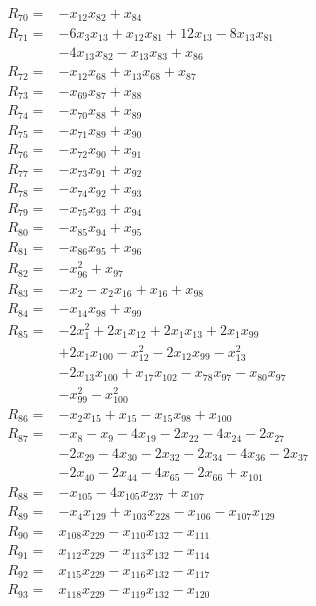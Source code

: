 \begin{align*}
R_{70}={}&-x_{12}x_{82} +x_{84}\\[3pt]
R_{71}={}&-6x_{3}x_{13} +x_{12}x_{81} +12x_{13} -8x_{13}x_{81}\\
&-4x_{13}x_{82} -x_{13}x_{83} +x_{86}\\[3pt]
R_{72}={}&-x_{12}x_{68} +x_{13}x_{68} +x_{87}\\[3pt]
R_{73}={}&-x_{69}x_{87} +x_{88}\\[3pt]
R_{74}={}&-x_{70}x_{88} +x_{89}\\[3pt]
R_{75}={}&-x_{71}x_{89} +x_{90}\\[3pt]
R_{76}={}&-x_{72}x_{90} +x_{91}\\[3pt]
R_{77}={}&-x_{73}x_{91} +x_{92}\\[3pt]
R_{78}={}&-x_{74}x_{92} +x_{93}\\[3pt]
R_{79}={}&-x_{75}x_{93} +x_{94}\\[3pt]
R_{80}={}&-x_{85}x_{94} +x_{95}\\[3pt]
R_{81}={}&-x_{86}x_{95} +x_{96}\\[3pt]
R_{82}={}&-x_{96}^{2} +x_{97}\\[3pt]
R_{83}={}&-x_{2} -x_{2}x_{16} +x_{16} +x_{98}\\[3pt]
R_{84}={}&-x_{14}x_{98} +x_{99}\\[3pt]
R_{85}={}&-2x_{1}^{2} +2x_{1}x_{12} +2x_{1}x_{13} +2x_{1}x_{99}\\
&+2x_{1}x_{100} -x_{12}^{2} -2x_{12}x_{99} -x_{13}^{2}\\
&-2x_{13}x_{100} +x_{17}x_{102} -x_{78}x_{97} -x_{80}x_{97}\\
&-x_{99}^{2} -x_{100}^{2}\\[3pt]
R_{86}={}&-x_{2}x_{15} +x_{15} -x_{15}x_{98} +x_{100}\\[3pt]
R_{87}={}&-x_{8} -x_{9} -4x_{19} -2x_{22} -4x_{24} -2x_{27}\\
&-2x_{29} -4x_{30} -2x_{32} -2x_{34} -4x_{36} -2x_{37}\\
&-2x_{40} -2x_{44} -4x_{65} -2x_{66} +x_{101}\\[3pt]
R_{88}={}&-x_{105} -4x_{105}x_{237} +x_{107}\\[3pt]
R_{89}={}&-x_{4}x_{129} +x_{103}x_{228} -x_{106} -x_{107}x_{129}\\[3pt]
R_{90}={}&x_{108}x_{229} -x_{110}x_{132} -x_{111}\\[3pt]
R_{91}={}&x_{112}x_{229} -x_{113}x_{132} -x_{114}\\[3pt]
R_{92}={}&x_{115}x_{229} -x_{116}x_{132} -x_{117}\\[3pt]
R_{93}={}&x_{118}x_{229} -x_{119}x_{132} -x_{120}\\[3pt]

\end{align*}
